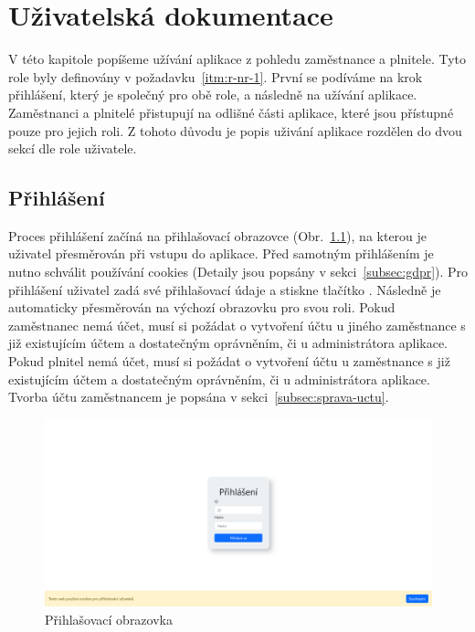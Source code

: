 \chapter{Uživatelská dokumentace}\label{ch:uzivatelska-dokumentace}

V této kapitole popíšeme užívání aplikace z pohledu zaměstnance a plnitele.
Tyto role byly definovány v požadavku~\ref{itm:r-nr-1}.
První se podíváme na krok přihlášení, který je společný pro obě role, a následně na užívání aplikace.
Zaměstnanci a plnitelé přistupují na odlišné části aplikace, které jsou přístupné pouze pro jejich roli.
Z tohoto důvodu je popis uživání aplikace rozdělen do dvou sekcí dle role uživatele.

\section{Přihlášení}\label{sec:prihlaseni}

Proces přihlášení začíná na přihlašovací obrazovce (Obr.~\ref{fig:login-screenshot}), na kterou je uživatel přesměrován při vstupu do aplikace.
Před samotným přihlášením je nutno schválit používání cookies (Detaily jsou popsány v sekci~\ref{subsec:gdpr}).
Pro přihlášení uživatel zadá své přihlašovací údaje a stiskne tlačítko .
Následně je automaticky přesměrován na výchozí obrazovku pro svou roli.
Pokud zaměstnanec nemá účet, musí si požádat o vytvoření účtu u jiného zaměstnance s již existujícím účtem a dostatečným oprávněním, či u administrátora aplikace.
Pokud plnitel nemá účet, musí si požádat o vytvoření účtu u zaměstnance s již existujícím účtem a dostatečným oprávněním, či u administrátora aplikace.
Tvorba účtu zaměstnancem je popsána v sekci~\ref{subsec:sprava-uctu}.

\begin{figure}[H]
    \centering
    \includegraphics[width=\textwidth]{../img/screenshots/login}
    \caption{Přihlašovací obrazovka}\label{fig:login-screenshot}
\end{figure}


